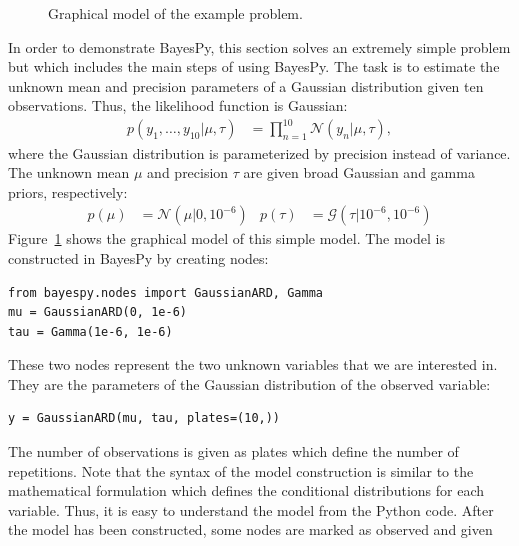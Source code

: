 \documentclass[twoside,11pt]{article}
\begin{document}
\begin{figure}
  \centering
  \caption{Graphical model of the example problem.}
  \label{fig:graphical_model}
\end{figure}
In order to demonstrate BayesPy, this section solves an extremely simple problem
but which includes the main steps of using BayesPy.  The task is to estimate the
unknown mean and precision parameters of a Gaussian distribution given ten
observations.  Thus, the likelihood function is Gaussian:
\begin{align*}
  p(y_1,\ldots,y_{10}|\mu,\tau) &= \prod^{10}_{n=1}\mathcal{N}(y_n | \mu, \tau),
\end{align*}
where the Gaussian distribution is parameterized by precision instead of
variance.  The unknown mean $\mu$ and precision $\tau$ are given broad Gaussian
and gamma priors, respectively:
\begin{align*}
  p(\mu) &= \mathcal{N}(\mu|0, 10^{-6}) & p(\tau) &= \mathcal{G}(\tau|10^{-6},
  10^{-6})
\end{align*}
Figure~\ref{fig:graphical_model} shows the graphical model of this simple model.
The model is constructed in BayesPy by creating nodes:
\begin{lstlisting}
from bayespy.nodes import GaussianARD, Gamma
mu = GaussianARD(0, 1e-6)
tau = Gamma(1e-6, 1e-6)
\end{lstlisting}
These two nodes represent the two unknown variables that we are interested in.
They are the parameters of the Gaussian distribution of the observed variable:
\begin{lstlisting}
y = GaussianARD(mu, tau, plates=(10,))
\end{lstlisting}
The number of observations is given as plates which define the number of
repetitions.  Note that the syntax of the model construction is similar to the
mathematical formulation which defines the conditional distributions for each
variable.  Thus, it is easy to understand the model from the Python code.  After
the model has been constructed, some nodes are marked as observed and given
\end{document}
